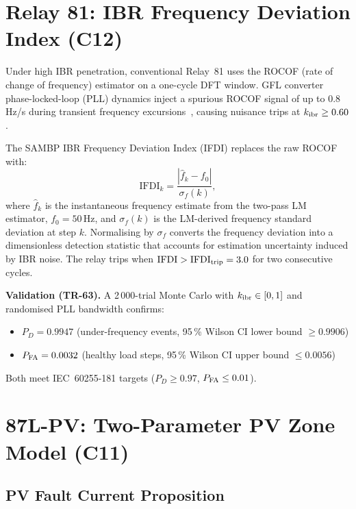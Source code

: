 \documentclass[journal,twoside]{IEEEtran}
\begin{document}
\section{Relay 81: IBR Frequency Deviation Index (C12)}
\label{sec:relay81}

Under high IBR penetration, conventional Relay~81 uses the ROCOF (rate of change
of frequency) estimator on a one-cycle DFT window.
GFL converter phase-locked-loop (PLL) dynamics inject a spurious ROCOF signal
of up to 0.8\,Hz/s during transient frequency excursions~\cite{Kamwa2011},
causing nuisance trips at $k_{\rm ibr} \geq 0.60$.

The SAMBP IBR Frequency Deviation Index (IFDI) replaces the raw ROCOF with:
\begin{equation}
  \mathrm{IFDI}_k = \frac{|\hat{f}_k - f_0|}{\sigma_f(k)},
  \label{eq:ifdi}
\end{equation}
where $\hat{f}_k$ is the instantaneous frequency estimate from the two-pass LM
estimator, $f_0 = 50\,\text{Hz}$, and $\sigma_f(k)$ is the LM-derived
frequency standard deviation at step $k$.
Normalising by $\sigma_f$ converts the frequency deviation into a
dimensionless detection statistic that accounts for estimation uncertainty
induced by IBR noise.
The relay trips when $\mathrm{IFDI} > \mathrm{IFDI}_{\rm trip} = 3.0$ for two
consecutive cycles.

\medskip\noindent\textbf{Validation (TR-63).}
A 2\,000-trial Monte Carlo with $k_{\rm ibr} \in [0, 1]$ and randomised
PLL bandwidth confirms:
\begin{itemize}
  \item $P_D = 0.9947$ (under-frequency events, 95\,\% Wilson CI lower bound
        $\geq 0.9906$)
  \item $P_{\rm FA} = 0.0032$ (healthy load steps, 95\,\% Wilson CI
        upper bound $\leq 0.0056$)
\end{itemize}
Both meet IEC~60255-181 targets ($P_D \geq 0.97$, $P_{\rm FA} \leq 0.01$).

\section{87L-PV: Two-Parameter PV Zone Model (C11)}
\label{sec:87lpv}

\subsection{PV Fault Current Proposition}
\end{document}
